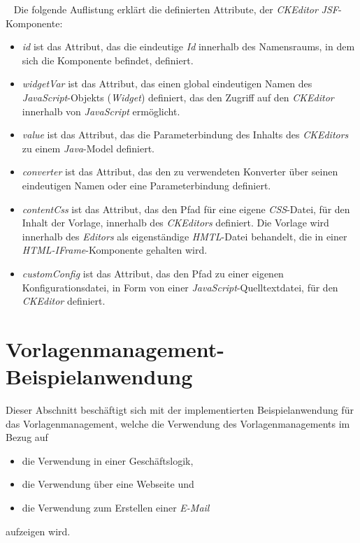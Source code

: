 \ \newline
Die folgende Auflistung erklärt die definierten Attribute, der \emph{CKEditor} \emph{JSF}-Komponente:
\begin{itemize}
	\item\emph{id} ist das Attribut, das die eindeutige \emph{Id} innerhalb des Namensraums, in dem sich die Komponente befindet, definiert.
	\item\emph{widgetVar} ist das Attribut, das einen global eindeutigen Namen des \emph{JavaScript}-Objekts (\emph{Widget}) definiert, das den Zugriff auf den \emph{CKEditor} innerhalb von \emph{JavaScript} ermöglicht.
	\item\emph{value} ist das Attribut, das die Parameterbindung des Inhalts des \emph{CKEditors} zu einem \emph{Java}-Model definiert.
	\item\emph{converter} ist das Attribut, das den zu verwendeten Konverter über seinen eindeutigen Namen oder eine Parameterbindung definiert.
	\item\emph{contentCss} ist das Attribut, das den Pfad für eine eigene \emph{CSS}-Datei, für den Inhalt der Vorlage, innerhalb des \emph{CKEditors} definiert. Die Vorlage wird innerhalb des \emph{Editors} als eigenständige \emph{HMTL}-Datei behandelt, die in einer \emph{HTML-IFrame}-Komponente gehalten wird.
	\item\emph{customConfig} ist das Attribut, das den Pfad zu einer eigenen Konfigurationsdatei, in Form von einer \emph{JavaScript}-Quelltextdatei, für den \emph{CKEditor} definiert.
\end{itemize}

\section{Vorlagenmanagement-Beispielanwendung}
Dieser Abschnitt beschäftigt sich mit der implementierten Beispielanwendung für das Vorlagenmanagement, welche die Verwendung des Vorlagenmanagements im Bezug auf 
\begin{itemize}
	\item die Verwendung in einer Geschäftslogik,
	\item die Verwendung über eine Webseite und
	\item die Verwendung zum Erstellen einer \emph{E-Mail} 
\end{itemize}
aufzeigen wird. 
